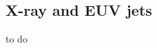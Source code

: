 \documentclass[12pt]{ociamthesis}
\begin{document}
\subsection{X-ray and EUV jets}
\label{subsec:euv}
to do
\end{document}
